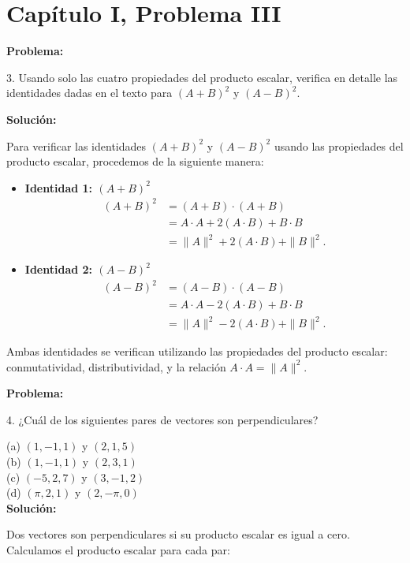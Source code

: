 \section*{Capítulo I, Problema III}

\textbf{Problema:}

3. Usando solo las cuatro propiedades del producto escalar, verifica en detalle las identidades dadas en el texto para $(A + B)^2$ y $(A - B)^2$.

\textbf{Solución:}

Para verificar las identidades $(A + B)^2$ y $(A - B)^2$ usando las propiedades del producto escalar, procedemos de la siguiente manera:

\begin{itemize}
    \item \textbf{Identidad 1: $(A + B)^2$}
    \begin{align*}
        (A + B)^2 &= (A + B) \cdot (A + B) \\
        &= A \cdot A + 2(A \cdot B) + B \cdot B \\
        &= \|A\|^2 + 2(A \cdot B) + \|B\|^2.
    \end{align*}

    \item \textbf{Identidad 2: $(A - B)^2$}
    \begin{align*}
        (A - B)^2 &= (A - B) \cdot (A - B) \\
        &= A \cdot A - 2(A \cdot B) + B \cdot B \\
        &= \|A\|^2 - 2(A \cdot B) + \|B\|^2.
    \end{align*}
\end{itemize}

Ambas identidades se verifican utilizando las propiedades del producto escalar: conmutatividad, distributividad, y la relación $A \cdot A = \|A\|^2$.

\textbf{Problema:}

4. ¿Cuál de los siguientes pares de vectores son perpendiculares?

(a) $(1, -1, 1)$ y $(2, 1, 5)$\\
(b) $(1, -1, 1)$ y $(2, 3, 1)$\\
(c) $(-5, 2, 7)$ y $(3, -1, 2)$\\
(d) $(\pi, 2, 1)$ y $(2, -\pi, 0)$\\

\textbf{Solución:}

Dos vectores son perpendiculares si su producto escalar es igual a cero. Calculamos el producto escalar para cada par:

